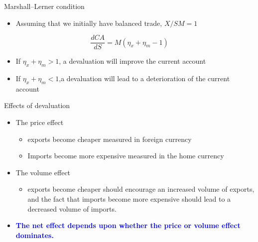 \documentclass[10pt,hyperref={CJKbookmarks=true},xcolor=dvipsnames,aspectratio=169]{beamer}
\begin{document}
\begin{frame}{Marshall–Lerner condition}

\begin{itemize}
\item Assuming that we initially have balanced trade, $X/SM=1$
\end{itemize}

\[
\frac{dCA}{dS}=M\left(\eta_{x}+\eta_{m}-1\right)
\]

\begin{itemize}
\item If $\eta_x+\eta_m>1$, a devaluation will improve the current account
\item If $\eta_x+\eta_m<1$,a devaluation will lead to a deterioration of
the current account
\end{itemize}
\end{frame}

\begin{frame}{Effects of devaluation}

\begin{itemize}
\item The price effect

\begin{itemize}
\item exports become cheaper measured in foreign currency
\item Imports become more expensive measured in the home currency
\end{itemize}
\item The volume effect

\begin{itemize}
\item exports become cheaper should encourage an increased volume of exports,
and the fact that imports become more expensive should lead to a decreased
volume of imports.
\end{itemize}
\item \textbf{\textcolor{blue}{The net effect depends upon whether the price
or volume effect dominates.}}
\end{itemize}
\end{frame}
\end{document}
